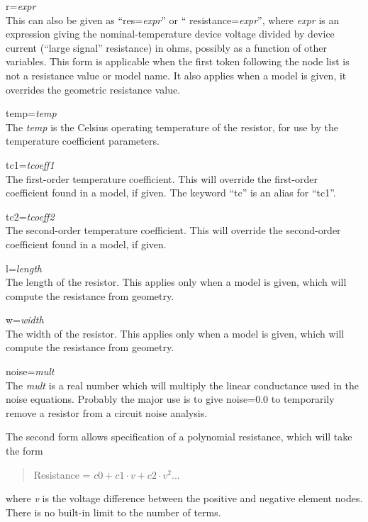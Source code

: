 \begin{description}
\item{\vt r=}{\it expr}\\
This can also be given as ``{\vt res=}{\it expr\/}'' or ``{\vt
resistance=}{\it expr\/}'', where {\it expr} is an expression giving
the nominal-temperature device voltage divided by device current
(``large signal'' resistance) in ohms, possibly as a function of other
variables.  This form is applicable when the first token following the
node list is not a resistance value or model name.  It also applies
when a model is given, it overrides the geometric resistance value.

\item{\vt temp=}{\it temp}\\
The {\it temp} is the Celsius operating temperature of the resistor,
for use by the temperature coefficient parameters.

\item{\vt tc1=}{\it tcoeff1}\\
The first-order temperature coefficient.  This will override the
first-order coefficient found in a model, if given.  The keyword
``{\vt tc}'' is an alias for ``{\vt tc1}''.

\item{\vt tc2=}{\it tcoeff2}\\
The second-order temperature coefficient.  This will override the
second-order coefficient found in a model, if given.

\item{\vt l=}{\it length}\\
The length of the resistor.  This applies only when a model is given,
which will compute the resistance from geometry.

\item{\vt w=}{\it width}\\
The width of the resistor.  This applies only when a model is given,
which will compute the resistance from geometry.

\item{\vt noise=}{\it mult}\\
The {\it mult} is a real number which will multiply the linear
conductance used in the noise equations.  Probably the major use is to
give {\vt noise=0.0} to temporarily remove a resistor from a circuit
noise analysis.
\end{description}

The second form allows specification of a polynomial resistance, which
will take the form
\begin{quote}
Resistance = $c0 + c1{\cdot}v + c2{\cdot}v^2 ...$
\end{quote}
where {\it v} is the voltage difference between the positive and
negative element nodes.  There is no built-in limit to the number of
terms.

